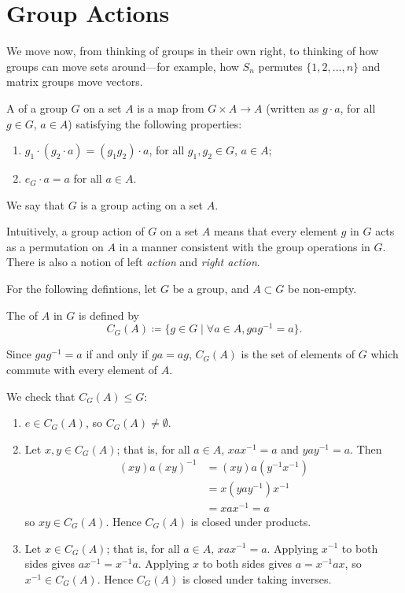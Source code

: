 \begin{theorem}

\end{theorem}
\pagebreak

\section{Group Actions}
We move now, from thinking of groups in their own right, to thinking of how groups can move sets around---for example, how $S_n$ permutes $\{1,2,\dots,n\}$ and matrix groups move vectors.

\begin{definition}
A  of a group $G$ on a set $A$ is a map from $G\times A\to A$ (written as $g\cdot a$, for all $g\in G$, $a\in A$) satisfying the following properties:
\begin{enumerate}[label=(\roman*)]
\item $g_1\cdot(g_2\cdot a)=(g_1g_2)\cdot a$, for all $g_1,g_2\in G$, $a\in A$;
\item $e_G\cdot a=a$ for all $a\in A$.
\end{enumerate}
We say that $G$ is a group acting on a set $A$.
\end{definition}

Intuitively, a group action of $G$ on a set $A$ means that every element $g$ in $G$ acts as a permutation on $A$ in a manner consistent with the group operations in $G$. There is also a notion of left \emph{action} and \emph{right action}.

For the following defintions, let $G$ be a group, and $A\subset G$ be non-empty.

\begin{definition}[Centraliser]
The  of $A$ in $G$ is defined by
\[C_G(A)\coloneqq\{g\in G\mid\forall a\in A,gag^{-1}=a\}.\]
\end{definition}

Since $gag^{-1}=a$ if and only if $ga=ag$, $C_G(A)$ is the set of elements of $G$ which commute with every element of $A$.

We check that $C_G(A)\le G$:
\begin{enumerate}[label=(\roman*)]
\item $e\in C_G(A)$, so $C_G(A)\neq\emptyset$.
\item Let $x,y\in C_G(A)$; that is, for all $a\in A$, $xax^{-1}=a$ and $yay^{-1}=a$. Then
\begin{align*}
(xy)a(xy)^{-1}&=(xy)a(y^{-1}x^{-1})\\
&=x(yay^{-1})x^{-1}\\
&=xax^{-1}=a
\end{align*}
so $xy\in C_G(A)$. Hence $C_G(A)$ is closed under products.
\item Let $x\in C_G(A)$; that is, for all $a\in A$, $xax^{-1}=a$. Applying $x^{-1}$ to both sides gives $ax^{-1}=x^{-1}a$. Applying $x$ to both sides gives $a=x^{-1}ax$, so $x^{-1}\in C_G(A)$. Hence $C_G(A)$ is closed under taking inverses.
\end{enumerate}

